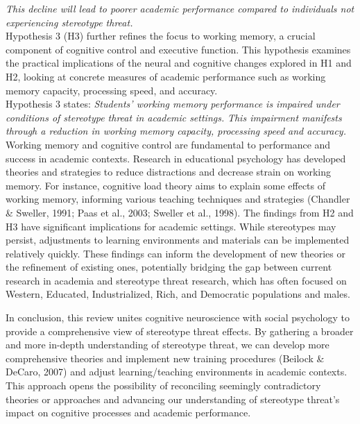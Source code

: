 \documentclass[
  stu, a4paper,floatsintext]{apa7}
\begin{document}
\emph{This decline will lead to poorer academic performance compared to individuals not experiencing stereotype threat.}\\
Hypothesis 3 (H3) further refines the focus to working memory, a crucial component of cognitive control and executive function.
This hypothesis examines the practical implications of the neural and cognitive changes explored in H1 and H2, looking at concrete measures of academic performance such as working memory capacity, processing speed, and accuracy.\\
Hypothesis 3 states: \emph{Students' working memory performance is impaired under conditions of stereotype threat in academic settings.}
\emph{This impairment manifests through a reduction in working memory capacity, processing speed and accuracy.}\\
Working memory and cognitive control are fundamental to performance and success in academic contexts. Research in educational psychology has developed theories and strategies to reduce distractions and decrease strain on working memory.
For instance, cognitive load theory aims to explain some effects of working memory, informing various teaching techniques and strategies (Chandler \& Sweller, 1991; Paas et al., 2003; Sweller et al., 1998).
The findings from H2 and H3 have significant implications for academic settings.
While stereotypes may persist, adjustments to learning environments and materials can be implemented relatively quickly.
These findings can inform the development of new theories or the refinement of existing ones, potentially bridging the gap between current research in academia and stereotype threat research, which has often focused on Western, Educated, Industrialized, Rich, and Democratic populations and males.

In conclusion, this review unites cognitive neuroscience with social psychology to provide a comprehensive view of stereotype threat effects.
By gathering a broader and more in-depth understanding of stereotype threat, we can develop more comprehensive theories and implement new training procedures (Beilock \& DeCaro, 2007) and adjust learning/teaching environments in academic contexts.
This approach opens the possibility of reconciling seemingly contradictory theories or approaches and advancing our understanding of stereotype threat's impact on cognitive processes and academic performance.
\end{document}
